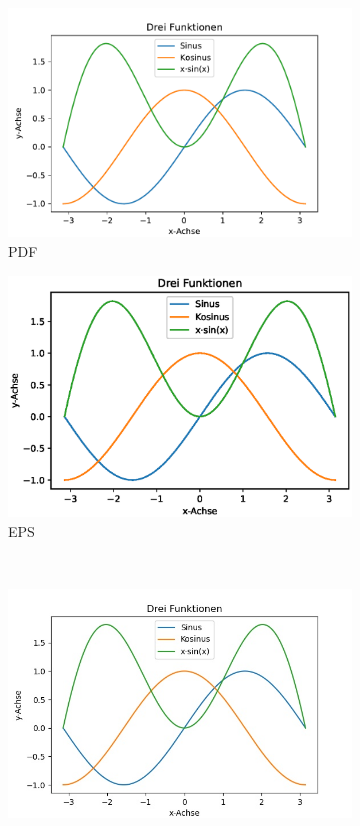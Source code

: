 \documentclass[12pt]{article}
\theoremstyle{definition}
\numberwithin{equation}{section}
\begin{document}
\begin{figure}[htb]
  \centering
  \begin{subfigure}[t]{.49\textwidth}
    \centering
    \includegraphics[width=\textwidth]{python/Bild.pdf}
    \caption{PDF}
    \label{Abb:PDF}
  \end{subfigure}
  \begin{subfigure}[t]{.49\textwidth}
    \centering
    \includegraphics[width=\textwidth]{python/Bild.eps}
    \caption{EPS}
    \label{Abb:EPS}
  \end{subfigure} \\
  \begin{subfigure}[t]{.49\textwidth}
    \centering
    \includegraphics[width=\textwidth]{python/Bild.jpg}

\end{subfigure}
\end{figure}
\end{document}
